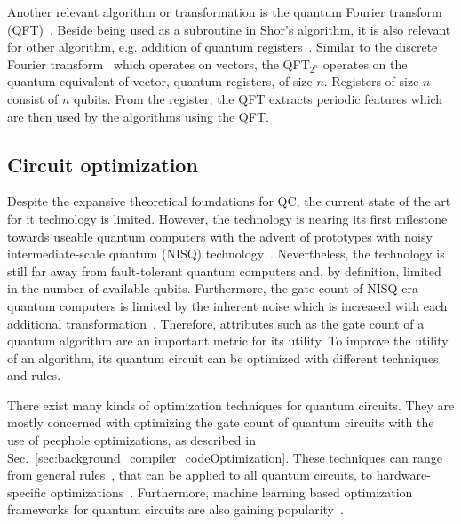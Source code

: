 Another relevant algorithm or transformation is the quantum Fourier transform (QFT)~\cite{Copp02}. Beside being used as a subroutine in Shor's algorithm, it is also relevant for other algorithm, e.g. addition of quantum registers~\cite{Drap00}. Similar to the discrete Fourier transform~\cite{Wino78} which operates on vectors, the QFT$_{2^n}$ operates on the quantum equivalent of vector, quantum registers, of size $n$. Registers of size $n$ consist of $n$ qubits. From the register, the QFT extracts periodic features which are then used by the algorithms using the QFT.

\subsection{Circuit optimization}
\label{sec:background_circuitOptimization}
Despite the expansive theoretical foundations for QC, the current state of the art for it technology is limited. However, the technology is nearing its first milestone towards useable quantum computers with the advent of prototypes with noisy intermediate-scale quantum (NISQ) technology~\cite{BFA22}. Nevertheless, the technology is still far away from fault-tolerant quantum computers and, by definition, limited in the number of available qubits. Furthermore, the gate count of NISQ era quantum computers is limited by the inherent noise which is increased with each additional transformation~\cite{Pres18}. Therefore, attributes such as the gate count of a quantum algorithm are an important metric for its utility. To improve the utility of an algorithm, its quantum circuit can be optimized with different techniques and rules.

There exist many kinds of optimization techniques for quantum circuits. They are mostly concerned with optimizing the gate count of quantum circuits with the use of peephole optimizations, as described in Sec.~\ref{sec:background_compiler_codeOptimization}. These techniques can range from general rules~\cite{GaCh11, LBZ21}, that can be applied to all quantum circuits, to hardware-specific optimizations~\cite{KMO*23}. Furthermore, machine learning based optimization frameworks for quantum circuits are also gaining popularity~\cite{FNML21,LPM*24, RLB*24}.

